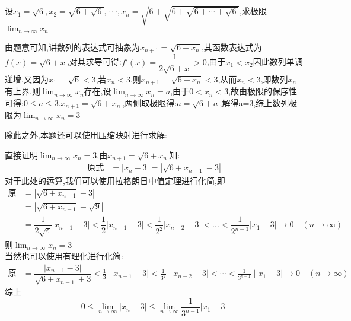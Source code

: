 \documentclass[8pt a4paper, oneside, UTF8]{ctexbook}
\begin{document}
\begin{sloppypar}
\begin{problem}
    设$x_1=\sqrt{6},x_2=\sqrt{6+\sqrt{6}},\cdotp\cdotp\cdotp,x_n=\sqrt{6+\sqrt{6+\sqrt{6+\cdots+\sqrt{6}}}}$,求极限$\lim_{n \to \infty}x_n$
    \end{problem}
    \begin{solution}
        由题意可知,讲数列的表达式可抽象为$x_{n+1}=\sqrt{6+x_n}$,其函数表达式为$f(x)=\sqrt{6+x}$,对其求导可得:$f'(x)=\dfrac{1}{2\sqrt{6+x}}>0$,由于$x_1<x_2$因此数列单调递增.又因为$x_1=\sqrt{6}<3$,若$x_n<3$,则$x_{n+1}=\sqrt{6+x_n}<3$,从而$x_n<3$,即数列$x_n$有上界,则$\lim_{n\to \infty} x_n$存在,设$\lim_{n\to \infty}x_n=a$,由于$0<x_n<3$,故由极限的保序性可得:$0\leqslant a \leqslant 3$.$x_{n+1}=\sqrt{6+x_n}$,两侧取极限得:$a=\sqrt{6+a}$,解得a=3,综上数列极限为$\lim_{n\to \infty }x_n=3$
    \end{solution}
    \begin{note}
        除此之外,本题还可以使用压缩映射进行求解:
        \begin{solution}
            直接证明$\lim_{n\to \infty}x_n=3$,由$x_{n+1}=\sqrt{6+x_n}$知:\begin{align*}
                \text{原式} & =|x_n-3|=|\sqrt{6+x_{n-1}}-3|
            \end{align*}
            对于此处的运算,我们可以使用拉格朗日中值定理进行化简,即
            \begin{align*}
                \text{原式} & =|\sqrt{6+x_{n-1}}-3|                                                                                                                                \\
                          & = |\sqrt{6+x_{n-1}}-\sqrt{9}|                                                                                                                        \\
                          & = \dfrac{1}{2\sqrt{\varepsilon}}|x_{n-1}-3|<\dfrac{1}{2}|x_{n-1}-3|<\dfrac{1}{2^2}|x_{n-2}-3|<...<\dfrac{1}{2^{n-1}}|x_1-3|\to 0 \quad (n\to \infty)
            \end{align*}
            则$\lim_{n\to \infty}x_n=3$\\
            当然也可以使用有理化进行化简:
            \begin{align*}
                \text{原式} & =\dfrac{|x_{n-1}-3|}{\sqrt{6+x_{n-1}}+3}<\frac{1}{3}\mid x_{n-1}-3\mid<\frac{1}{3^{2}}\mid x_{n-2}-3\mid<\cdots<\frac{1}{3^{n-1}}\mid x_{1}-3\mid\to0 \quad (n\to \infty)
            \end{align*}
            综上
            $$
                0 \leqslant \lim_{n\to \infty}|x_n-3| \leqslant \lim_{n\to \infty} \dfrac{1}{3^{n-1}}|x_1-3|
$$
\end{solution}
\end{note}
\end{sloppypar}
\end{document}
